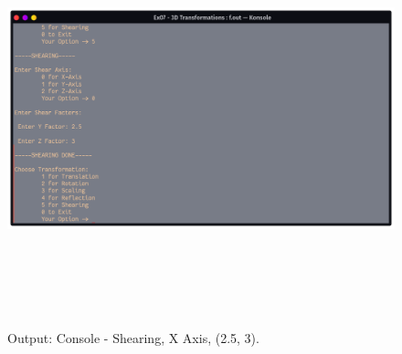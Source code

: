 \documentclass[12pt, a4]{article}
\begin{document}
\subsection*{}
\begin{figure}[h]
\centering
\caption{Output: Console - Shearing, X Axis, (2.5, 3).}
\includegraphics[height=12cm, width=17cm]{Outputs/Console-5.png}
\end{figure}

\newpage
\end{document}
